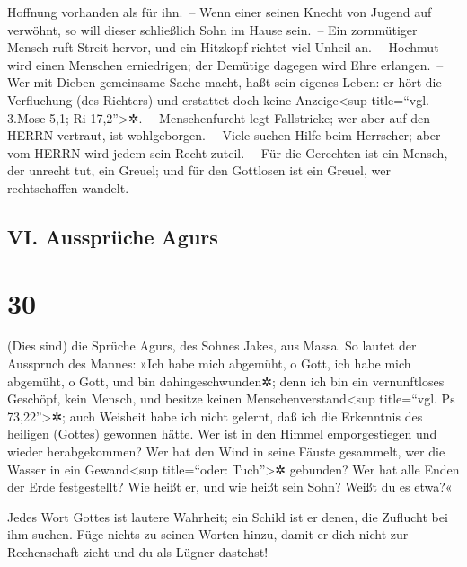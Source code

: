 Hoffnung vorhanden als für ihn.~-- Wenn einer seinen
Knecht von Jugend auf verwöhnt, so will dieser schließlich Sohn im Hause
sein.~-- Ein zornmütiger Mensch ruft Streit hervor, und
ein Hitzkopf richtet viel Unheil an.~-- Hochmut wird
einen Menschen erniedrigen; der Demütige dagegen wird Ehre erlangen.~--
Wer mit Dieben gemeinsame Sache macht, haßt sein eigenes
Leben: er hört die Verfluchung (des Richters) und erstattet doch keine
Anzeige\textless sup title=``vgl. 3.Mose 5,1; Ri 17,2''\textgreater✲.~--
Menschenfurcht legt Fallstricke; wer aber auf den HERRN
vertraut, ist wohlgeborgen.~-- Viele suchen Hilfe beim
Herrscher; aber vom HERRN wird jedem sein Recht zuteil.~--
Für die Gerechten ist ein Mensch, der unrecht tut, ein
Greuel; und für den Gottlosen ist ein Greuel, wer rechtschaffen wandelt.

\hypertarget{vi.-ausspruxfcche-agurs}{%
\subsection{VI. Aussprüche Agurs}\label{vi.-ausspruxfcche-agurs}}

\hypertarget{section-29}{%
\section{30}\label{section-29}}

(Dies sind) die Sprüche Agurs, des Sohnes Jakes, aus
Massa. So lautet der Ausspruch des Mannes: »Ich habe mich abgemüht, o
Gott, ich habe mich abgemüht, o Gott, und bin dahingeschwunden✲;
denn ich bin ein vernunftloses Geschöpf, kein Mensch, und
besitze keinen Menschenverstand\textless sup title=``vgl. Ps
73,22''\textgreater✲; auch Weisheit habe ich nicht
gelernt, daß ich die Erkenntnis des heiligen (Gottes) gewonnen hätte.
Wer ist in den Himmel emporgestiegen und wieder
herabgekommen? Wer hat den Wind in seine Fäuste gesammelt, wer die
Wasser in ein Gewand\textless sup title=``oder: Tuch''\textgreater✲
gebunden? Wer hat alle Enden der Erde festgestellt? Wie heißt er, und
wie heißt sein Sohn? Weißt du es etwa?«

Jedes Wort Gottes ist lautere Wahrheit; ein Schild ist er
denen, die Zuflucht bei ihm suchen. Füge nichts zu seinen
Worten hinzu, damit er dich nicht zur Rechenschaft zieht und du als
Lügner dastehst!

